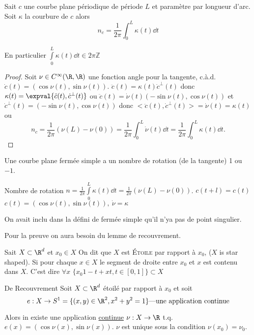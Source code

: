 		\begin{theorem}
			Sait $c$ une courbe plane périodique de période $L$ et paramètre par longueur d'arc. Soit $\kappa$ la courbure de $c$ alors
			$$n_c=\frac{1}{2\pi}\int_0^L\kappa(t)\dd{t}$$
		\end{theorem}
		
		\begin{remark}
			En particulier $\int\limits_0^L\kappa(t)\dd{t}\in 2\pi\mathbb{Z}$
		\end{remark}
		\begin{proof}
			Soit $\nu\in C^\infty(\R, \R)$ une fonction angle pour la tangente, c.à.d. $\dot{c}(t)=(\cos \nu(t), \sin\nu(t))$. $\ddot{c}(t)=\kappa(t)\dot{c}^\perp (t)$ donc $\kappa(t)=\expval{\ddot{c}(t), \dot{c}^\perp (t)}$ ou $\ddot{c}(t)=\dot{\nu}(t)(-\sin\nu(t), \cos\nu(t))$ et $\dot{c}^\perp(t)=(-\sin\nu(t),\cos\nu(t))$
			donc $<\ddot{c}(t), \dot{c}^\perp(t)>=\dot{\nu}(t)=\kappa(t)$ ou
			$$n_c = \frac{1}{2\pi}(\nu(L)-\nu(0))=\frac{1}{2\pi}\int_0^L \dot{\nu}(t)\dd{t}=\frac{1}{2\pi}\int_0^L\kappa(t)\dd{t}.$$
		\end{proof}

		\begin{theorem}
			Une courbe plane fermée simple a un nombre de rotation (de la tangente) 1 ou $-1$.
		\end{theorem}

		Nombre de rotation $n=\frac{1}{2\pi}\int\limits_0^L\kappa(t)\dd{t}=\frac{1}{2\pi}(\nu(L)-\nu(0))$. $c(t+l)=c(t)$ $c(t)=(\cos \nu (t), \sin \nu(t)),\ \dot\nu=\kappa$
		\begin{remark}
			On avait inclu dans la défini de fermée simple qu'il n'ya pas de point singulier.
		\end{remark}
	
		Pour la preuve on aura besoin du lemme de recouvrement.

		\begin{definition}
			Sait $X\subset \R^d$ et $x_0\in X$ On dit que $X$ est \textsc{Étoile} par rapport à $x_0$, ($X$ is star shaped). Si pour chaque $x\in X$ le segment de droite entre $x_0$ et $x$ est contenu dans $X$. C'est dire $\forall x$ $\{x_0{1-t}+xt, t\in[0,1]\}\subset X$
		\end{definition}

		\begin{lemme}{De Recouvrement}
			Soit $X\subset \R^d$ étoilé par rapport à $x_0$ et soit
			$$e: X\rightarrow S^1=\{(x,y)\in\R^2, x^2+y^2=1\} \text{---une application continue}$$
	
			Alors in existe une application \underline{continue} $\nu: X\rightarrow \R$ t.q. $e(x)=(\cos\nu(x), \sin\nu(x))$. $\nu$ est unique sous la condition $\nu(x_0)=\nu_0$.
		\end{lemme}

